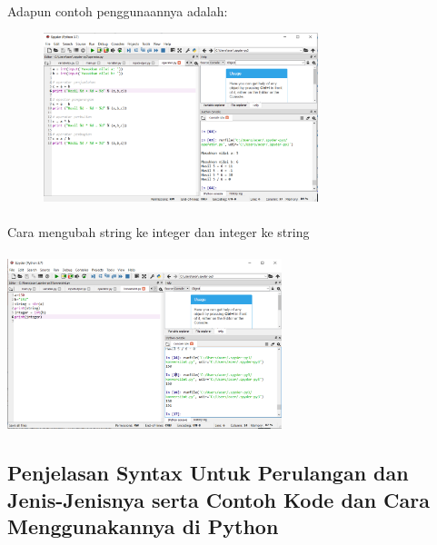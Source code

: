 \paragraph{} Adapun contoh penggunaannya adalah: 
\begin{figure}[h]
                 \centerline{\includegraphics[width=8cm]{gambar/operator2.PNG}}
        \end{figure}
\paragraph{} Cara mengubah string ke integer dan integer ke string
\paragraph{}
    \centerline{\includegraphics[width=8cm]{gambar/konversi.PNG}}
    
\subsection{Penjelasan Syntax Untuk Perulangan dan Jenis-Jenisnya serta Contoh Kode dan Cara Menggunakannya di Python}
